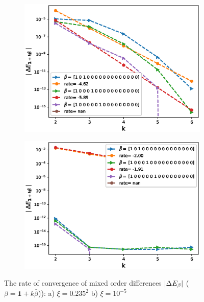 \documentclass[11pt]{article}
\begin{document}
\begin{figure}[h!]
\centering
\begin{subfigure}{.5\textwidth}
\centering
\includegraphics[width=1\linewidth]{./figures/effect_rho_differences/H_0_43_K_0_8/N_8/mixed_difference_order2_rbergomi_8steps_H_043_K_0_8_rho__0_9_with_rate_W1}
\caption{}
\label{fig:sub3}
\end{subfigure}%
\begin{subfigure}{.5\textwidth}
\centering
\includegraphics[width=1\linewidth]{./figures/effect_xi_differences/H_0_43_K_0_8/N_8/mixed_difference_order2_rbergomi_8steps_H_043_K_0_8_xi_10__5_with_rate_W1}
\caption{}
\label{fig:sub4}
\end{subfigure}

\caption{The rate of convergence of  mixed order differences $\left\lvert\Delta E_{\beta}\right\rvert$ ($\beta=\mathbf{1}+k \bar{\beta}$)): a) $\xi=0.235^2$ b)  $\xi=10^{-5}$}
\label{fig:test2}
\end{figure}
\end{document}

